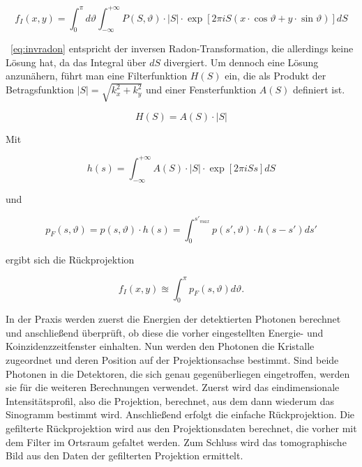 \documentclass[slug=PET, room=Andreas-Schubert-Bau\,\ 424A, supervisor=Carsten\ Bittrich, coursedate=10.\ 01.\ 2020]{../../Lab_Report_LaTeX/lab_report}
\begin{document}
\begin{equation}\label{eq:invradon}
	f_I(x,y) = \int_{0}^{\pi} d\vartheta \int_{-\infty}^{+\infty} P(S, \vartheta) \cdot |S| \cdot \exp[2\pi i S(x \cdot \cos\vartheta + y \cdot \sin\vartheta)] dS
\end{equation}

~\eqref{eq:invradon} entspricht der inversen Radon-Transformation, die allerdings keine Lösung
hat, da das Integral über \(dS\) divergiert.
Um dennoch eine Lösung anzunähern, führt man eine Filterfunktion \(H(S)\) ein, die als Produkt der
Betragsfunktion \(|S| = \sqrt{k_x^2+k_y^2}\) und einer Fensterfunktion \(A(S)\) definiert ist.

\begin{equation}\label{eq:filterfkt}
	H(S) = A(S) \cdot |S|
\end{equation}

Mit

\begin{equation}\label{eq:filterkern}
	h(s) = \int_{-\infty}^{+\infty} A(S) \cdot |S| \cdot \exp[2\pi i Ss] dS
\end{equation}

und

\begin{equation}\label{eq:gefltdaten}
	p_F(s, \vartheta) = p(s, \vartheta) \cdot h(s) = \int_{0}^{s'_{max}} p(s', \vartheta) \cdot h(s-s') ds'
\end{equation}

ergibt sich die Rückprojektion

\begin{equation}\label{eq:rücktrafo}
	f_I(x,y) \approxeq \int_{0}^{\pi} p_F(s,\vartheta) d\vartheta .
\end{equation}

In der Praxis werden zuerst die Energien der detektierten Photonen berechnet und anschließend
überprüft, ob diese die vorher eingestellten Energie- und Koinzidenzzeitfenster einhalten.
Nun werden den Photonen die Kristalle zugeordnet und deren Position auf der Projektionsachse
bestimmt. Sind beide Photonen in die Detektoren, die sich genau gegenüberliegen eingetroffen,
werden sie für die weiteren Berechnungen verwendet.
Zuerst wird das eindimensionale Intensitätsprofil, also die Projektion, berechnet, aus dem dann
wiederum das Sinogramm bestimmt wird. Anschließend erfolgt die einfache Rückprojektion.
Die gefilterte Rückprojektion wird aus den Projektionsdaten berechnet, die vorher mit dem Filter
im Ortsraum gefaltet werden. Zum Schluss wird das tomographische Bild aus den Daten der
gefilterten Projektion ermittelt.
\end{document}
